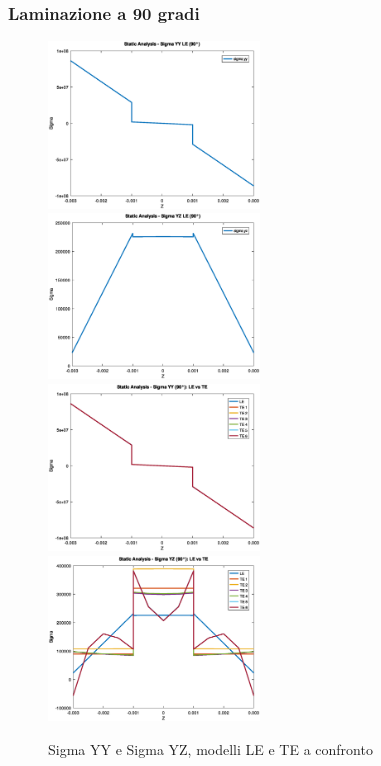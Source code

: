 \documentclass{article}
\begin{document}
            \subsubsection{Laminazione a 90 gradi\label{statica_stress_90}}

            \begin{figure}[h!]
                 \label{fig:sigmas_static_90}
                \includegraphics[width=0.5\textwidth]{MUL2/Esercitazione3/MUL2_FEM/OUTPUT/PLOT/static_YY_LE_90.svg.eps}
                \includegraphics[width=0.5\textwidth]{MUL2/Esercitazione3/MUL2_FEM/OUTPUT/PLOT/static_YZ_LE_90.svg.eps}
                \includegraphics[width=0.5\textwidth]{MUL2/Esercitazione3/MUL2_FEM/OUTPUT/PLOT/static_YY_LEvsTE_90.svg.eps}
                \includegraphics[width=0.5\textwidth]{MUL2/Esercitazione3/MUL2_FEM/OUTPUT/PLOT/static_YZ_LEvsTE_90.svg.eps}
                \caption{Sigma YY e Sigma YZ, modelli LE e TE a confronto}
            \end{figure}
\end{document}
